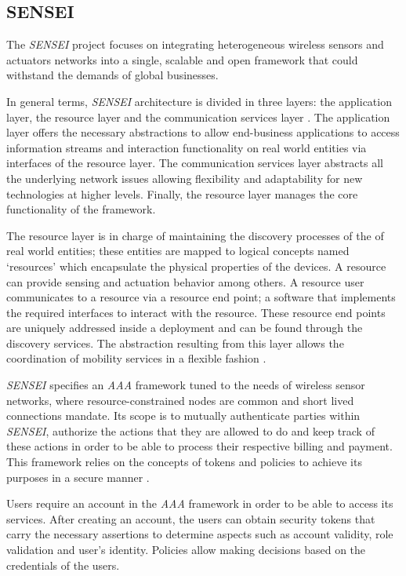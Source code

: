 \documentclass[journal]{IEEEtran}
\begin{document}
  \subsection{SENSEI}
  The \emph{SENSEI} project \cite{SENSEIWeb} focuses on integrating heterogeneous wireless sensors and actuators networks into a single, scalable and open framework that could withstand the demands of global businesses.
  
  In general terms, \emph{SENSEI} architecture is divided in three layers: the application layer, the resource layer and the communication services layer \cite{Tsiatsis2010}. The application layer offers the necessary abstractions to allow end-business applications to access information streams and interaction functionality on real world entities via interfaces of the resource layer. The communication services layer abstracts all the underlying network issues allowing flexibility and adaptability for new technologies at higher levels. Finally, the resource layer manages the core functionality of the framework. 

  The resource layer is in charge of maintaining the discovery processes of the of real world entities; these entities are mapped to logical concepts named `resources' which encapsulate the physical properties of the devices. A resource can provide sensing and actuation behavior among others. A resource user communicates to a resource via a resource end point; a software that implements the required interfaces to interact with the resource. These resource end points are uniquely addressed inside a deployment and can be found through the discovery services. The abstraction resulting from this layer allows the coordination of mobility services in a flexible fashion \cite{Tsiatsis2010}. 
  
  \emph{SENSEI} specifies an \emph{AAA} framework tuned to the needs of wireless sensor networks, where resource-constrained nodes are common and short lived connections mandate. Its scope is to mutually authenticate parties within \emph{SENSEI}, authorize the actions that they are allowed to do and keep track of these actions in order to be able to process their respective billing and payment. This framework relies on the concepts of tokens and policies to achieve its purposes in a secure manner \cite{Bauge2010}.

  Users require an account in the \emph{AAA} framework in order to be able to access its services. After creating an account, the users can obtain security tokens that carry the necessary assertions to determine aspects such as account validity, role validation and user's identity. Policies allow making decisions based on the credentials of the users.
\end{document}
